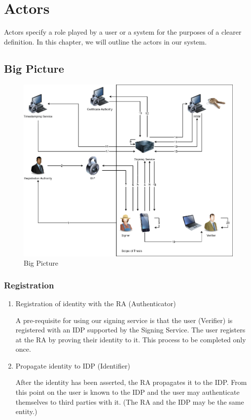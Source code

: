 \chapter{Actors}
\label{ch:actors}

Actors specify a role played by a user or a system for the purposes of a clearer definition.
In this chapter, we will outline the actors in our system.

\begin{landscape}
	\section{Big Picture}
	\begin{figure}[H]
		\begin{center}
			\includegraphics[scale=0.55]{images/BigPicture.png}
			\caption{Big Picture}
			\label{fig:bigpicture}
		\end{center}
	\end{figure}
\end{landscape}

\subsection{Registration}
\begin{enumerate}
	\item Registration of identity with the \gls{RA} (Authenticator)
	
	A pre-requisite for using our signing service is that the user (Verifier) is registered with an \gls{IDP} supported by the Signing Service.
	The user registers at the \gls{RA} by proving their identity to it.
	This process to be completed only once.

	\item Propagate identity to \gls{IDP} (Identifier)
	
	After the identity has been asserted, the \gls{RA} propagates it to the \gls{IDP}.
    From this point on the user is known to the \gls{IDP} and the user may authenticate themselves to third parties with it.
	(The \gls{RA} and the \gls{IDP} may be the same entity.)

\end{enumerate}

